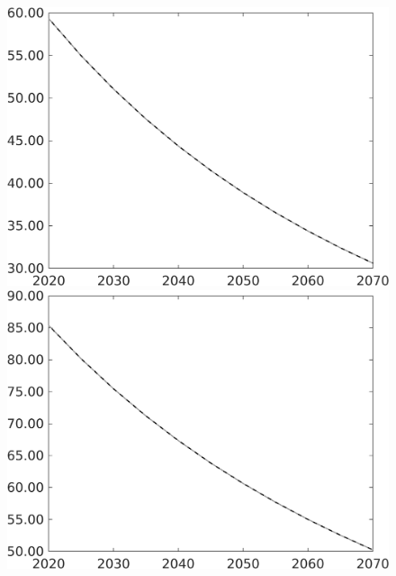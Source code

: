 \documentclass[12pt]{article}
\begin{document}
\begin{figure}[h!!]
\begin{minipage}[]{0.32\textwidth}
	\end{minipage}	
	\begin{minipage}[]{0.32\textwidth}
		\includegraphics[width=1\textwidth]{../../codding_model/own_basedOnFried/optimalPol_010922_revision/figures/all_13Sept22/CompTaul_Equlab_LFBAU_Reg0_gAg_spillover0_nsk1_xgr0_knspil1_sep1_countec0_GovRev0_etaa0.79_lgd0.png}
	\end{minipage}	
	\begin{minipage}[]{0.32\textwidth}
		\includegraphics[width=1\textwidth]{../../codding_model/own_basedOnFried/optimalPol_010922_revision/figures/all_13Sept22/CompTaul_Equlab_LFBAU_Reg0_gAf_spillover0_nsk1_xgr0_knspil1_sep1_countec0_GovRev0_etaa0.79_lgd0.png}

\end{minipage}
\end{figure}
\end{document}
